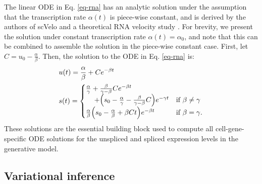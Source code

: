 \documentclass[
  sn-mathphys-num,
  lineno,
  twocolumn]{sn-jnl}
\begin{document}
The linear ODE in Eq. \ref{eq-rna} has an analytic solution under the
assumption that the transcription rate \(\alpha(t)\) is piece-wise
constant, and is derived by the authors of scVelo and a theoretical RNA
velocity study \citep{Bergen2020-pj, Li2021-qa}. For brevity, we present
the solution under constant transcription rate \(\alpha(t) = \alpha_0\),
and note that this can be combined to assemble the solution in the
piece-wise constant case. First, let \(C = u_0 - \frac{\alpha}{\beta}\).
Then, the solution to the ODE in Eq. \ref{eq-rna} is: \begin{equation}
\label{eq-rna-solution}
\begin{aligned}
  &u(t) = \frac{\alpha}{\beta} + C e^{-\beta t} \\
  &s(t) = 
  \begin{cases}
    \frac{\alpha}{\gamma} + \frac{\beta}{\gamma - \beta} C e^{-\beta t} \\
    \hskip 12pt + \Big(s_0 - \frac{\alpha}{\gamma} - \frac{\beta}{\gamma - \beta} C\Big) e^{-\gamma t} & \text{if } \beta \neq \gamma \\
    \frac{\alpha}{\beta} \Big(s_0 - \frac{\alpha}{\beta} + \beta C t\Big) e^{-\beta t} & \text{if } \beta = \gamma.
  \end{cases}
\end{aligned}
\end{equation} These solutions are the essential building block used to
compute all cell-gene-specific ODE solutions for the unspliced and
spliced expression levels in the generative model.

\subsection{Variational inference}\label{sec-methods-inference}
\end{document}
